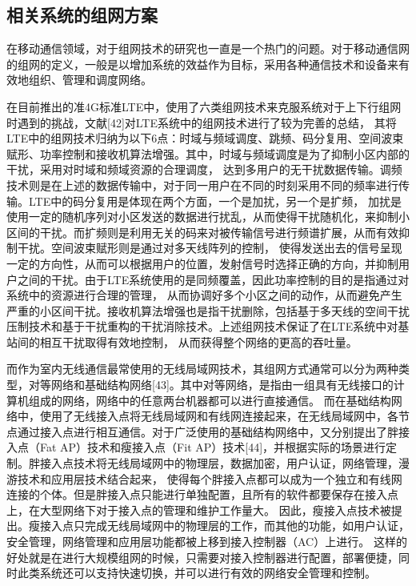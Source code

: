\subsection{相关系统的组网方案}
在移动通信领域，对于组网技术的研究也一直是一个热门的问题。对于移动通信网的组网的定义，一般是以增加系统的效益作为目标，采用各种通信技术和设备来有效地组织、管理和调度网络。

在目前推出的准4G标准LTE中，使用了六类组网技术来克服系统对于上下行组网时遇到的挑战，文献[42]对LTE系统中的组网技术进行了较为完善的总结，
其将LTE中的组网技术归纳为以下6点：时域与频域调度、跳频、码分复用、空间波束赋形、功率控制和接收机算法增强。其中，时域与频域调度是为了抑制小区内部的干扰，采用对时域和频域资源的合理调度，
达到多用户的无干扰数据传输。调频技术则是在上述的数据传输中，对于同一用户在不同的时刻采用不同的频率进行传输。LTE中的码分复用是体现在两个方面，一个是加扰，另一个是扩频，
加扰是使用一定的随机序列对小区发送的数据进行扰乱，从而使得干扰随机化，来抑制小区间的干扰。而扩频则是利用无关的码来对被传输信号进行频谱扩展，从而有效抑制干扰。空间波束赋形则是通过对多天线阵列的控制，
使得发送出去的信号呈现一定的方向性，从而可以根据用户的位置，发射信号时选择正确的方向，并抑制用户之间的干扰。由于LTE系统使用的是同频覆盖，因此功率控制的目的是指通过对系统中的资源进行合理的管理，
从而协调好多个小区之间的动作，从而避免产生严重的小区间干扰。接收机算法增强也是指干扰删除，包括基于多天线的空间干扰压制技术和基于干扰重构的干扰消除技术。上述组网技术保证了在LTE系统中对基站间的相互干扰取得有效地控制，
从而获得整个网络的更高的吞吐量。

而作为室内无线通信最常使用的无线局域网技术，其组网方式通常可以分为两种类型，对等网络和基础结构网络[43]。其中对等网络，是指由一组具有无线接口的计算机组成的网络，网络中的任意两台机器都可以进行直接通信。
而在基础结构网络中，使用了无线接入点将无线局域网和有线网连接起来，在无线局域网中，各节点通过接入点进行相互通信。对于广泛使用的基础结构网络中，又分别提出了胖接入点（Fat AP）技术和瘦接入点（Fit AP）技术[44]，并根据实际的场景进行定制。胖接入点技术将无线局域网中的物理层，数据加密，用户认证，网络管理，漫游技术和应用层技术结合起来，
使得每个胖接入点都可以成为一个独立和有线网连接的个体。但是胖接入点只能进行单独配置，且所有的软件都要保存在接入点上，在大型网络下对于接入点的管理和维护工作量大。
因此，瘦接入点技术被提出。瘦接入点只完成无线局域网中的物理层的工作，而其他的功能，如用户认证，安全管理，网络管理和应用层功能都被上移到接入控制器（AC）上进行。
这样的好处就是在进行大规模组网的时候，只需要对接入控制器进行配置，部署便捷，同时此类系统还可以支持快速切换，并可以进行有效的网络安全管理和控制。

